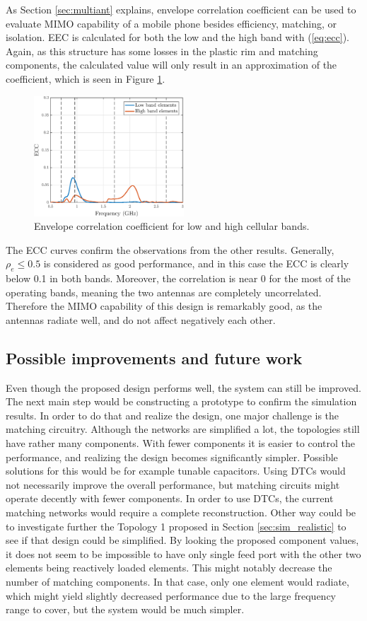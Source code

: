 As Section \ref{sec:multiant} explains, envelope correlation coefficient can be used to evaluate MIMO capability of a mobile phone besides efficiency, matching, or isolation. EEC is calculated for both the low and the high band with (\ref{eq:ecc}). Again, as this structure has some losses in the plastic rim and matching components, the calculated value will only result in an approximation of the coefficient, which is seen in Figure \ref{fig:ecc}. 
\begin{figure}[H]
    \centering
    \includegraphics[width=0.5\textwidth]{img/ecc.eps}
    \caption{Envelope correlation coefficient for low and high cellular bands.}
    \label{fig:ecc}
\end{figure}

The ECC curves confirm the observations from the other results. Generally, $\rho_e\leq0.5$ is considered as good performance, and in this case the ECC is clearly below 0.1 in both bands. Moreover, the correlation is near 0 for the most of the operating bands, meaning the two antennas are completely uncorrelated. Therefore the MIMO capability of this design is remarkably good, as the antennas radiate well, and do not affect negatively each other.

\subsection{Possible improvements and future work}
\label{sec:improvements}
Even though the proposed design performs well, the system can still be improved. The next main step would be constructing a prototype to confirm the simulation results. In order to do that and realize the design, one major challenge is the matching circuitry. Although the networks are simplified a lot, the topologies still have rather many components. With fewer components it is easier to control the performance, and realizing the design becomes significantly simpler. Possible solutions for this would be for example tunable capacitors. Using DTCs would not necessarily improve the overall performance, but matching circuits might operate decently with fewer components. In order to use DTCs, the current matching networks would require a complete reconstruction. Other way could be to investigate further the Topology 1 proposed in Section \ref{sec:sim_realistic} to see if that design could be simplified. By looking the proposed component values, it does not seem to be impossible to have only single feed port with the other two elements being reactively loaded elements. This might notably decrease the number of matching components. In that case, only one element would radiate, which might yield slightly decreased performance due to the large frequency range to cover, but the system would be much simpler.

